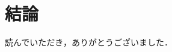 \documentclass[./main]{subfiles}
\begin{document}
\section{結論}
読んでいただき，ありがとうございました．

\end{document}
